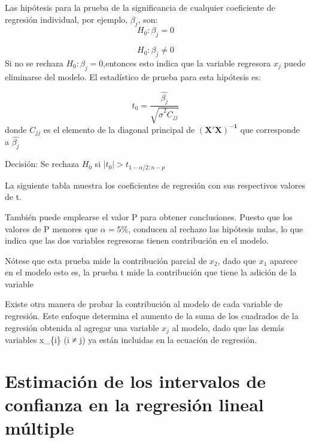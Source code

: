 \documentclass[
]{book}
\begin{document}
Las hipótesis para la prueba de la significancia de cualquier coeficiente de regresión individual, por ejemplo, \(\beta_{j}\), son:
\[
\begin{equation}
H_{0}:\beta_{j}=0
\label{eq:hipotesis-nula-coeficiente} 
\end{equation}
\]

\[
\begin{equation}
H_{0}:\beta_{j}≠0
\label{eq:hipotesis-alternativa-coeficiente} 
\end{equation}
\] Si no se rechaza \(H_{0}:\beta_{j}=0\),entonces esto indica que la variable regresora \(x_{j}\) puede eliminarse del modelo. El estadístico de prueba para esta hipótesis es:

\[
\begin{equation}
t_{0}=\frac{\hat{\beta_{j}}}{\sqrt{\hat{\sigma}^{2}C_{jj}}}
\label{eq:estadistico-t}
\end{equation}
\] donde \(C_{jj}\) es el elemento de la diagonal principal de \(\boldsymbol{(X'X)^{-1}}\) que corresponde a \(\hat{\beta_{j}}\)

Decisión: Se rechaza \(H_{0}\) si \(|t_{0}|>t_{1-\alpha/2;n-p}\)

La siguiente tabla muestra los coeficientes de regresión con sus respectivos valores de t.

También puede emplearse el valor P para obtener conclusiones. Puesto que los valores de P menores que \(\alpha=5\)\%, conducen al rechazo las hipótesis nulas, lo que indica que las dos variables regresoras tienen contribución en el modelo.

Nótese que esta prueba mide la contribución parcial de \(x_{2}\), dado que \(x_{1}\) aparece en el modelo esto es, la prueba t mide la contribución que tiene la adición de la variable

Existe otra manera de probar la contribución al modelo de cada variable de regresión. Este enfoque determina el aumento de la suma de los cuadrados de la regresión obtenida al agregar una variable \(x_{j}\) al modelo, dado que las demás variables x\_\{i\} (i ≠ j) ya están incluidas en la ecuación de regresión.

\hypertarget{estimaciuxf3n-de-los-intervalos-de-confianza-en-la-regresiuxf3n-lineal-muxfaltiple}{%
\section{Estimación de los intervalos de confianza en la regresión lineal múltiple}\label{estimaciuxf3n-de-los-intervalos-de-confianza-en-la-regresiuxf3n-lineal-muxfaltiple}}
\end{document}
